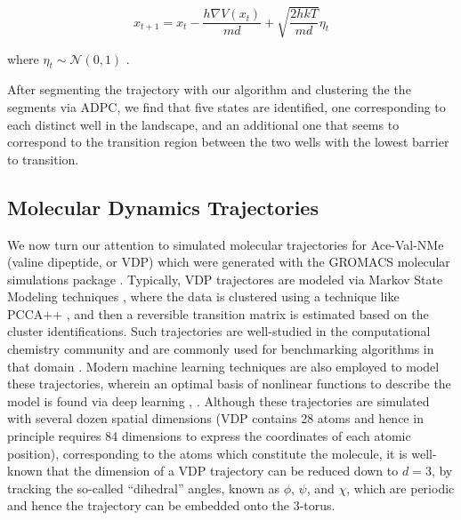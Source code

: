 \documentclass{article}
\begin{document}
\[x_{t+1} = x_t - \frac{h\nabla V(x_t)}{md} + \sqrt{\frac{2hkT}{md}}\eta_t\]

where \(\eta_t \sim \mathcal{N}(0,1)\) \cite{hoffmannDeeptimePythonLibrary2021}.

After segmenting the trajectory with our algorithm and clustering the the segments via ADPC, we find that five states are identified, one corresponding to each distinct well in the landscape, and an additional one that seems to correspond to the transition region between the two wells with the lowest barrier to transition.
\subsection{Molecular Dynamics Trajectories}
We now turn our attention to simulated molecular trajectories for Ace-Val-NMe (valine dipeptide, or VDP) which were generated with the GROMACS molecular simulations package \cite{abrahamGROMACSHighPerformance2015}. Typically, VDP trajectores are modeled via Markov State Modeling techniques \cite{bowmanIntroductionMarkovState2014}, where the data is clustered using a technique like PCCA++ \cite{roblitzFuzzySpectralClustering2013}, and then a reversible transition matrix is estimated based on the cluster identifications. Such trajectories are well-studied in the computational chemistry community and are commonly used for benchmarking algorithms in that domain \cite{damjanovicCATBOSSClusterAnalysis2021}.
Modern machine learning techniques are also employed to model these trajectories, wherein an optimal basis of nonlinear functions to describe the model is found via deep learning \cite{mardtVAMPnetsDeepLearning2018}, \cite{wuVariationalApproachLearning2020}.
Although these trajectories are simulated with several dozen spatial dimensions (VDP contains 28 atoms and hence in principle requires 84 dimensions to express the coordinates of each atomic position), corresponding to the atoms which constitute the molecule, it is well-known that the dimension of a VDP trajectory can be reduced down to \(d=3\), by tracking the so-called ``dihedral'' angles, known as \(\phi\), \(\psi\), and \(\chi\), which are periodic and hence the trajectory can be embedded onto the \(3\)-torus. 
\end{document}
